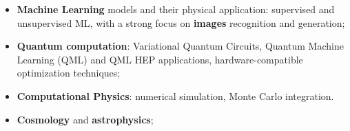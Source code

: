 %
%
%

\par{
\begin{itemize}
    \item \textbf{Machine Learning} models and their physical application: supervised and unsupervised ML, with a strong focus on \textbf{images} recognition and generation;
    \item \textbf{Quantum computation}: Variational Quantum Circuits, Quantum Machine Learning (QML) and QML HEP applications, hardware-compatible optimization techniques;
    \item \textbf{Computational Physics}: numerical simulation, Monte Carlo integration.
    \item \textbf{Cosmology} and \textbf{astrophysics};
\end{itemize} 
}

\vspace{0.2cm}